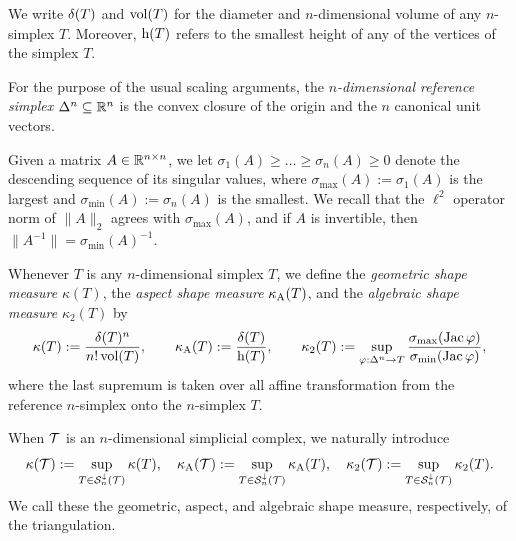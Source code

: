 \documentclass[10pt,letterpaper]{article}
\begin{document}
We write ${\delta}(T)$ and $\operatorname{vol}(T)$ for the diameter and $n$-dimensional volume of any $n$-simplex $T$.
Moreover, ${\rm h}(T)$ refers to the smallest height of any of the vertices of the simplex $T$.

For the purpose of the usual scaling arguments, the \emph{$n$-dimensional reference simplex} $\Delta^n \subseteq {\mathbb R}^n$ is the convex closure of the origin and the $n$ canonical unit vectors. 

Given a matrix $A \in {\mathbb R}^{n \times n}$, we let $\sigma_{1}(A) \geq \dots \geq \sigma_{n}(A) \geq 0$ denote the descending sequence of its singular values, 
where $\sigma_{\max}(A) := \sigma_{1}(A)$ is the largest and $\sigma_{\min}(A) := \sigma_{n}(A)$ is the smallest. 
We recall that the $\ell^{2}$ operator norm of $\|A\|_{2}$ agrees with $\sigma_{\max}(A)$,
and if $A$ is invertible, then $\|A^{-1}\| = \sigma_{\min}(A)^{-1}$.

Whenever $T$ is any $n$-dimensional simplex $T$,
we define the \textit{geometric shape measure} $\kappa(T)$,
the \textit{aspect shape measure} $\kappa_{{\rm A}}(T)$,
and 
the \textit{algebraic shape measure} $\kappa_{2}(T)$
by 
\begin{align}\label{math:shapemeasure}
    \kappa(T)
    := 
    \frac{ {\delta}(T)^{n} }{ n! \operatorname{vol}(T) }
    ,
    \qquad 
    \kappa_{{\rm A}}(T)
    := 
    \frac{ {\delta}(T) }{ {\rm h}(T) }
    ,
    \qquad 
    \kappa_{2}(T)
    := 
    \sup_{ \varphi : \Delta^n \rightarrow T } 
    \frac{ \sigma_{\max}( \operatorname{{\rm Jac}} \varphi ) }{ \sigma_{\min}( \operatorname{{\rm Jac}} \varphi ) }
    ,
\end{align}
where the last supremum is taken over all affine transformation from the reference $n$-simplex onto the $n$-simplex $T$. 

When ${\mathcal T}$ is an $n$-dimensional simplicial complex, we naturally introduce 
\begin{align}\label{math:shapemeasure:triangulation}
    \kappa({\mathcal T}) := \sup_{ T \in {\mathcal S}^{\downarrow}_{n}({\mathcal T}) } \kappa(T)
    ,
    \quad 
    \kappa_{{\rm A}}({\mathcal T}) := \sup_{ T \in {\mathcal S}^{\downarrow}_{n}({\mathcal T}) } \kappa_{{\rm A}}(T)
    ,
    \quad 
    \kappa_{2}({\mathcal T}) := \sup_{ T \in {\mathcal S}^{\downarrow}_{n}({\mathcal T}) } \kappa_{2}(T)
    .
\end{align}
We call these the geometric, aspect, and algebraic shape measure, respectively, of the triangulation. 
\end{document}
